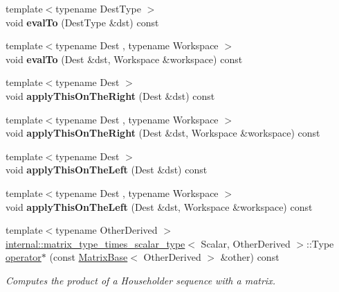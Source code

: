 \begin{DoxyCompactItemize}
{\footnotesize template$<$typename Dest\+Type $>$ }\\void {\bfseries eval\+To} (Dest\+Type \&dst) const
\item 
\mbox{\label{group___householder___module_a91d5354eb63c6d25e977fa4d393c78c4}} 
{\footnotesize template$<$typename Dest , typename Workspace $>$ }\\void {\bfseries eval\+To} (Dest \&dst, Workspace \&workspace) const
\item 
\mbox{\label{group___householder___module_a7ee4190e14c5e76a9680551c40db0a7d}} 
{\footnotesize template$<$typename Dest $>$ }\\void {\bfseries apply\+This\+On\+The\+Right} (Dest \&dst) const
\item 
\mbox{\label{group___householder___module_afc99539a130da4395c7df7d1ef1f43f3}} 
{\footnotesize template$<$typename Dest , typename Workspace $>$ }\\void {\bfseries apply\+This\+On\+The\+Right} (Dest \&dst, Workspace \&workspace) const
\item 
\mbox{\label{group___householder___module_a8bdafe8c85f1a4f76a983db1cfb87099}} 
{\footnotesize template$<$typename Dest $>$ }\\void {\bfseries apply\+This\+On\+The\+Left} (Dest \&dst) const
\item 
\mbox{\label{group___householder___module_a692c1997dc2acda1f4b282faf9432cd3}} 
{\footnotesize template$<$typename Dest , typename Workspace $>$ }\\void {\bfseries apply\+This\+On\+The\+Left} (Dest \&dst, Workspace \&workspace) const
\item 
{\footnotesize template$<$typename Other\+Derived $>$ }\\\hyperlink{struct_eigen_1_1internal_1_1matrix__type__times__scalar__type}{internal\+::matrix\+\_\+type\+\_\+times\+\_\+scalar\+\_\+type}$<$ Scalar, Other\+Derived $>$\+::Type \hyperlink{group___householder___module_ac57e5a22f1646e04a4f8b4cba3825928}{operator$\ast$} (const \hyperlink{group___core___module_class_eigen_1_1_matrix_base}{Matrix\+Base}$<$ Other\+Derived $>$ \&other) const
\begin{DoxyCompactList}\small\item\em Computes the product of a Householder sequence with a matrix. \end{DoxyCompactList}\item 

\end{DoxyCompactItemize}
